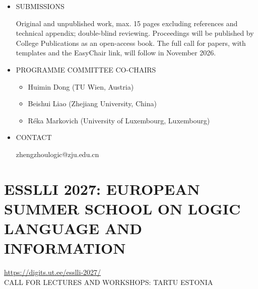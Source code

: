 \documentclass[prodmode,acmtecs]{acmsmall} %
\begin{document}
\begin{itemize}
\item  SUBMISSIONS 
 
  Original and unpublished work, max. 15 pages excluding references and technical appendix; double-blind reviewing. Proceedings will be published by College Publications as an open-access book. The full call for papers, with templates and the EasyChair link, will follow in November 2026. 
 
\item  PROGRAMME COMMITTEE CO-CHAIRS 
 
\begin{itemize}\item  Huimin Dong (TU Wien, Austria)
\item  Beishui Liao (Zhejiang University, China)
\item  Réka Markovich (University of Luxembourg, Luxembourg)
\end{itemize} 
\item  CONTACT 
 
  zhengzhoulogic@zju.edu.cn 
 
\end{itemize}\section{ESSLLI 2027: EUROPEAN SUMMER SCHOOL ON LOGIC LANGUAGE AND INFORMATION}\label{ESSLLI2027}  \href{https://digits.ut.ee/esslli-2027/}{https://digits.ut.ee/esslli-2027/}\\ 
CALL FOR LECTURES AND WORKSHOPS: TARTU ESTONIA 
\end{document}
